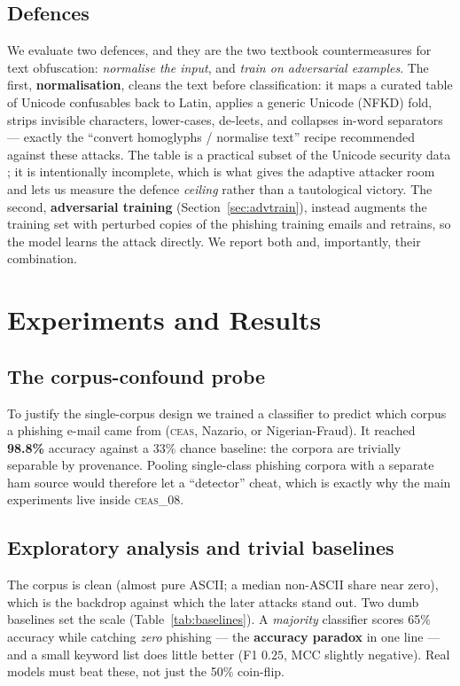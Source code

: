 \documentclass[11pt]{article}
\begin{document}
\subsection{Defences}
We evaluate two defences, and they are the two textbook countermeasures for text
obfuscation: \emph{normalise the input}, and \emph{train on adversarial examples}. The
first, \textbf{normalisation}, cleans the text before classification: it maps a curated
table of Unicode confusables back to Latin, applies a generic Unicode (NFKD) fold, strips
invisible characters, lower-cases, de-leets, and collapses in-word separators --- exactly
the ``convert homoglyphs / normalise text'' recipe recommended against these attacks. The table is a practical subset of the Unicode security
data \citep{unicode2023tr39}; it is intentionally incomplete, which is what gives the
adaptive attacker room and lets us measure the defence \emph{ceiling} rather than a
tautological victory. The second, \textbf{adversarial training}
(Section~\ref{sec:advtrain}), instead augments the training set with perturbed copies
of the phishing training emails and retrains, so the model learns the attack directly.
We report both and, importantly, their combination.

\section{Experiments and Results}

\subsection{The corpus-confound probe}
\label{sec:probe}
To justify the single-corpus design we trained a classifier to predict which corpus
a phishing e-mail came from (\textsc{ceas}, Nazario, or Nigerian-Fraud). It reached
\textbf{98.8\%} accuracy against a 33\% chance baseline: the corpora are trivially
separable by provenance. Pooling single-class phishing corpora with a separate ham
source would therefore let a ``detector'' cheat, which is exactly why the main
experiments live inside \textsc{ceas\_08}.

\subsection{Exploratory analysis and trivial baselines}
The corpus is clean (almost pure ASCII; a median non-ASCII share near zero), which
is the backdrop against which the later attacks stand out. Two dumb baselines set
the scale (Table~\ref{tab:baselines}). A \emph{majority} classifier scores 65\%
accuracy while catching \emph{zero} phishing --- the \textbf{accuracy paradox} in
one line --- and a small keyword list does little better (F1 $0.25$, MCC slightly
negative). Real models must beat these, not just the 50\% coin-flip.
\end{document}
